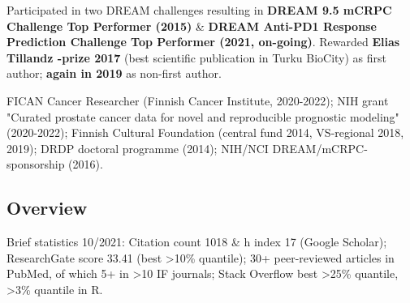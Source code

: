 \documentclass[letterpaper]{twentysecondcv} %
\begin{document}
\vspace*{-0.2cm}
Participated in two DREAM challenges resulting in \textbf{DREAM 9.5 mCRPC Challenge Top Performer (2015)} \& \textbf{DREAM Anti-PD1 Response Prediction Challenge Top Performer (2021, on-going)}. Rewarded \textbf{Elias Tillandz -prize 2017} (best scientific publication in Turku BioCity) as first author; \textbf{again in 2019} as non-first author.



\vspace*{-0.1cm}
FICAN Cancer Researcher (Finnish Cancer Institute, 2020-2022); NIH grant "Curated prostate cancer data for novel and reproducible prognostic modeling" (2020-2022); Finnish Cultural Foundation (central fund 2014, VS-regional 2018, 2019); DRDP doctoral programme (2014); NIH/NCI DREAM/mCRPC-sponsorship (2016).

\subsection{Overview}

\vspace*{-0.2cm}
Brief statistics 10/2021: Citation count 1018 \& h index 17 (Google Scholar); ResearchGate score 33.41 (best >10\% quantile); 30+ peer-reviewed articles in PubMed, of which 5+ in >10 IF journals; Stack Overflow best >25\% quantile, >3\% quantile in R.

\end{document}
